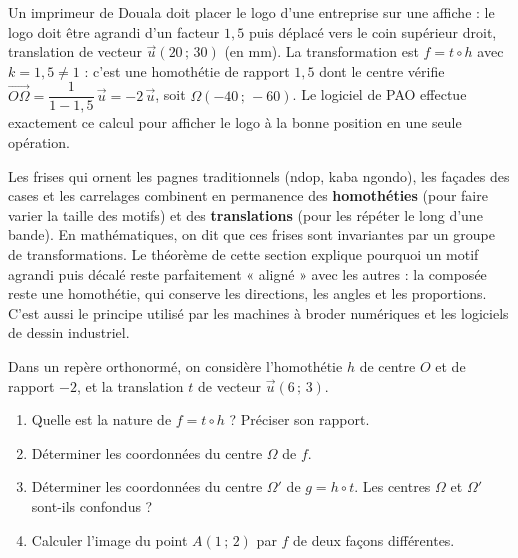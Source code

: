 \documentclass[11pt]{article}
\begin{document}
\begin{exemplebox}
Un imprimeur de Douala doit placer le logo d'une entreprise sur une affiche : le logo doit être agrandi d'un facteur $1{,}5$ puis déplacé vers le coin supérieur droit, translation de vecteur $\vec{u}(20\,;\,30)$ (en mm). La transformation est $f = t \circ h$ avec $k = 1{,}5 \neq 1$ : c'est une homothétie de rapport $1{,}5$ dont le centre vérifie $\overrightarrow{O\Omega} = \dfrac{1}{1 - 1{,}5}\,\vec{u} = -2\,\vec{u}$, soit $\Omega(-40\,;\,-60)$. Le logiciel de PAO effectue exactement ce calcul pour afficher le logo à la bonne position en une seule opération.
\end{exemplebox}

\begin{savaistu}
Les frises qui ornent les pagnes traditionnels (ndop, kaba ngondo), les façades des cases et les carrelages combinent en permanence des \textbf{homothéties} (pour faire varier la taille des motifs) et des \textbf{translations} (pour les répéter le long d'une bande). En mathématiques, on dit que ces frises sont invariantes par un groupe de transformations. Le théorème de cette section explique pourquoi un motif agrandi puis décalé reste parfaitement « aligné » avec les autres : la composée reste une homothétie, qui conserve les directions, les angles et les proportions. C'est aussi le principe utilisé par les machines à broder numériques et les logiciels de dessin industriel.
\end{savaistu}

\begin{exercice}[À faire]
Dans un repère orthonormé, on considère l'homothétie $h$ de centre $O$ et de rapport $-2$, et la translation $t$ de vecteur $\vec{u}(6\,;\,3)$.
\begin{enumerate}
\item Quelle est la nature de $f = t \circ h$ ? Préciser son rapport.
\item Déterminer les coordonnées du centre $\Omega$ de $f$.
\item Déterminer les coordonnées du centre $\Omega'$ de $g = h \circ t$. Les centres $\Omega$ et $\Omega'$ sont-ils confondus ?
\item Calculer l'image du point $A(1\,;\,2)$ par $f$ de deux façons différentes.
\end{enumerate}
\end{exercice}
\end{document}
